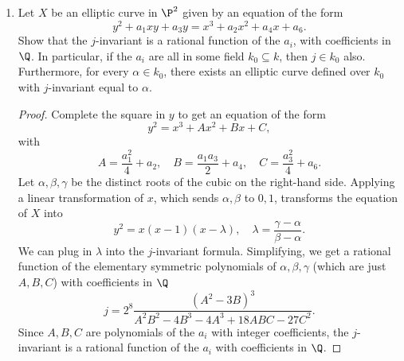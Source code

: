 \documentclass[a4paper]{article}
\begin{document}
\begin{enumerate} [label=\textbf{\arabic*.}, leftmargin=0em]
    \item[\textbf{4.}] Let $X$ be an elliptic curve in $\P^2$ given by an equation of the form
          \begin{equation*}
              y^2 + a_1xy + a_3y = x^3 + a_2x^2 + a_4x + a_6.
          \end{equation*}
          Show that the $j$-invariant is a rational function of the $a_i$, with coefficients in $\Q$.
          In particular, if the $a_i$ are all in some field $k_0 \subseteq k$, then $j \in k_0$ also.
          Furthermore, for every $\alpha \in k_0$, there exists an elliptic curve defined over $k_0$ with $j$-invariant equal to $\alpha$.

          \begin{proof}
              Complete the square in $y$ to get an equation of the form
              \begin{equation*}
                  y^2 = x^3 + Ax^2 + Bx + C,
              \end{equation*}
              with
              \begin{equation*}
                  A = \frac{a_1^2}{4} + a_2, \quad B = \frac{a_1a_3}{2} + a_4, \quad C = \frac{a_3^2}{4} + a_6.
              \end{equation*}
              Let $\alpha, \beta, \gamma$ be the distinct roots of the cubic on the right-hand side.
              Applying a linear transformation of $x$, which sends $\alpha, \beta$ to $0, 1$, transforms the equation of $X$ into
              \begin{equation*}
                  y^2 = x(x - 1)(x - \lambda), \quad \lambda = \frac{\gamma - \alpha}{\beta - \alpha}.
              \end{equation*}
              We can plug in $\lambda$ into the $j$-invariant formula.
              Simplifying, we get a rational function of the elementary symmetric polynomials of $\alpha, \beta, \gamma$ (which are just $A, B, C$) with coefficients in $\Q$
              \begin{equation*}
                  j = 2^8 \frac{(A^2 - 3B)^3}{A^2B^2 - 4B^3 -4A^3 + 18ABC - 27C^2}.
              \end{equation*}
              Since $A, B, C$ are polynomials of the $a_i$ with integer coefficients, the $j$-invariant is a rational function of the $a_i$ with coefficients in $\Q$.
          \end{proof}


\end{enumerate}
\end{document}
